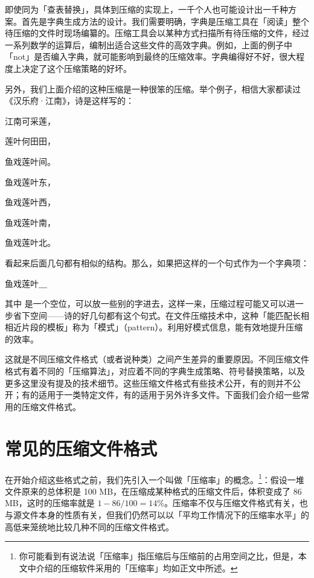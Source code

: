 即使同为「查表替换」，具体到压缩的实现上，一千个人也可能设计出一千种方案。首先是字典生成方法的设计。我们需要明确，字典是压缩工具在「阅读」整个待压缩的文件时现场编纂的。压缩工具会以某种方式扫描所有待压缩的文件，经过一系列数学的运算后，编制出适合这些文件的高效字典。例如，上面的例子中「not」是否编入字典，就可能影响到最终的压缩效率。字典编得好不好，很大程度上决定了这个压缩策略的好坏。

另外，我们上面介绍的这种压缩是一种很笨的压缩。举个例子，相信大家都读过《汉乐府·江南》，诗是这样写的：

\begin{quoting}
  江南可采莲，\par
  莲叶何田田，\par
  鱼戏莲叶间。\par
  鱼戏莲叶东，\par
  鱼戏莲叶西，\par
  鱼戏莲叶南，\par
  鱼戏莲叶北。
\end{quoting}

看起来后面几句都有相似的结构。那么，如果把这样的一个句式作为一个字典项：

\begin{MissingVerbatim}
  鱼戏莲叶＿
\end{MissingVerbatim}

其中  是一个空位，可以放一些别的字进去，这样一来，压缩过程可能又可以进一步省下空间——诗的好几句都有这个句式。在文件压缩技术中，这种「能匹配长相相近片段的模板」称为「模式」（pattern）。利用好模式信息，能有效地提升压缩的效率。

这就是不同压缩文件格式（或者说种类）之间产生差异的重要原因。不同压缩文件格式有着不同的「压缩算法」，对应着不同的字典生成策略、符号替换策略，以及更多这里没有提及的技术细节。这些压缩文件格式有些技术公开，有的则并不公开；有的适用于一类特定文件，有的适用于另外许多文件。下面我们会介绍一些常用的压缩文件格式。

\section{常见的压缩文件格式}

在开始介绍这些格式之前，我们先引入一个叫做「压缩率」的概念。\footnote{你可能看到有说法说「压缩率」指压缩后与压缩前的占用空间之比，但是，本文中介绍的压缩软件采用的「压缩率」均如正文中所述。}：假设一堆文件原来的总体积是 100 MB，在压缩成某种格式的压缩文件后，体积变成了 86 MB，这时的压缩率就是 $1 - 86/100 = 14\%$。压缩率不仅与压缩文件格式有关，也与源文件本身的性质有关，但我们仍然可以以「平均工作情况下的压缩率水平」的高低来笼统地比较几种不同的压缩文件格式。

